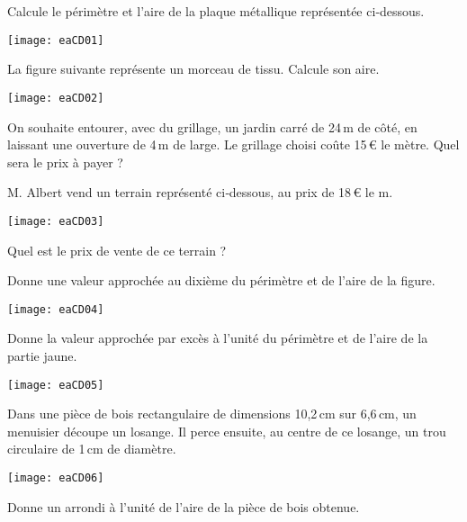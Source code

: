 
\begin{exercice}[]
Calcule le périmètre et l'aire de la plaque métallique représentée ci‑dessous.

\begin{center}
    \texttt{[image: eaCD01]}
\end{center}
\end{exercice}



\begin{exercice}[]
La figure suivante représente un morceau de tissu. Calcule son aire.
\begin{center}
    \texttt{[image: eaCD02]}
\end{center}
\end{exercice}

\begin{exercice}[]
On souhaite entourer, avec du grillage, un jardin carré de 24\,m de côté, en laissant une ouverture de 4\,m de large. Le grillage choisi coûte 15\,€ le mètre. Quel sera le prix à payer ?
\end{exercice}

\begin{exercice}[]
M. Albert vend un terrain représenté ci‑dessous, au prix de 18\,€ le m.

\begin{center}
    \texttt{[image: eaCD03]}
\end{center}

Quel est le prix de vente de ce terrain ?
\end{exercice}

\begin{exercice}[]
Donne une valeur approchée au dixième du périmètre et de l'aire de la figure.

\begin{center}
    \texttt{[image: eaCD04]}
\end{center}
\end{exercice}

\begin{exercice}[]
Donne la valeur approchée par excès à l'unité du périmètre et de l'aire de la partie jaune.
\begin{center}
    \texttt{[image: eaCD05]}
\end{center}
\end{exercice}

\begin{exercice}[]
Dans une pièce de bois rectangulaire de dimensions 10,2\,cm sur 6,6\,cm, un menuisier découpe un losange. Il perce ensuite, au centre de ce losange, un trou circulaire de 1\,cm de diamètre.

\begin{center}
    \texttt{[image: eaCD06]}
\end{center}

Donne un arrondi à l'unité de l'aire de la pièce de bois obtenue.
\end{exercice}

